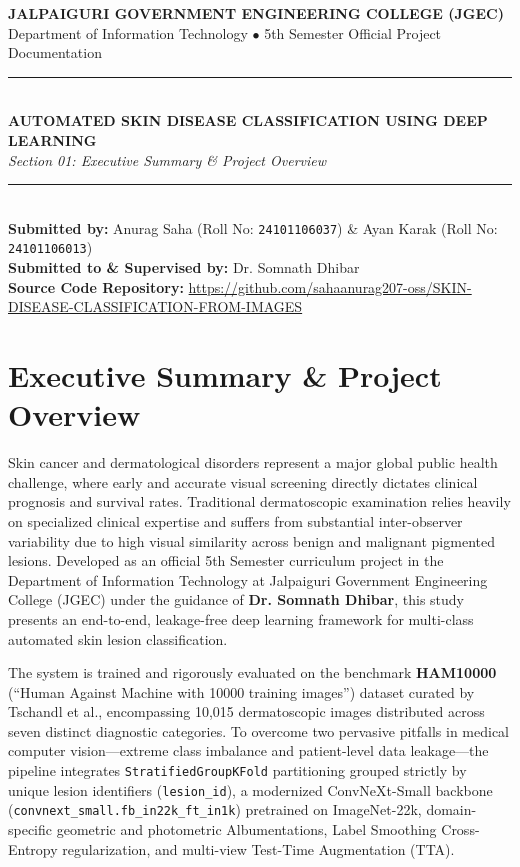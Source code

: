 \documentclass[12pt,a4paper]{article}
\begin{document}
\begin{center}
    {\Large \textbf{\color{primary} JALPAIGURI GOVERNMENT ENGINEERING COLLEGE (JGEC)}}\\[0.3em]
    {\normalsize Department of Information Technology $\bullet$ 5th Semester Official Project Documentation}\\[1em]
    \rule{\linewidth}{1.5pt}\\[0.5em]
    {\LARGE \textbf{AUTOMATED SKIN DISEASE CLASSIFICATION USING DEEP LEARNING}}\\[0.3em]
    {\large \textit{Section 01: Executive Summary \& Project Overview}}\\[0.3em]
    \rule{\linewidth}{1.5pt}\\[0.8em]
    \textbf{Submitted by:} Anurag Saha (Roll No: \texttt{24101106037}) \& Ayan Karak (Roll No: \texttt{24101106013})\\[0.3em]
    \textbf{Submitted to \& Supervised by:} Dr. Somnath Dhibar\\[0.3em]
    \textbf{Source Code Repository:} \url{https://github.com/sahaanurag207-oss/SKIN-DISEASE-CLASSIFICATION-FROM-IMAGES}
\end{center}

\vspace{0.8em}

\section{Executive Summary \& Project Overview}
Skin cancer and dermatological disorders represent a major global public health challenge, where early and accurate visual screening directly dictates clinical prognosis and survival rates. Traditional dermatoscopic examination relies heavily on specialized clinical expertise and suffers from substantial inter-observer variability due to high visual similarity across benign and malignant pigmented lesions. Developed as an official 5th Semester curriculum project in the Department of Information Technology at Jalpaiguri Government Engineering College (JGEC) under the guidance of \textbf{Dr. Somnath Dhibar}, this study presents an end-to-end, leakage-free deep learning framework for multi-class automated skin lesion classification.

The system is trained and rigorously evaluated on the benchmark \textbf{HAM10000} (``Human Against Machine with 10000 training images'') dataset curated by Tschandl et al., encompassing 10,015 dermatoscopic images distributed across seven distinct diagnostic categories. To overcome two pervasive pitfalls in medical computer vision---extreme class imbalance and patient-level data leakage---the pipeline integrates \texttt{StratifiedGroupKFold} partitioning grouped strictly by unique lesion identifiers (\texttt{lesion\_id}), a modernized ConvNeXt-Small backbone (\texttt{convnext\_small.fb\_in22k\_ft\_in1k}) pretrained on ImageNet-22k, domain-specific geometric and photometric Albumentations, Label Smoothing Cross-Entropy regularization, and multi-view Test-Time Augmentation (TTA).
\end{document}
